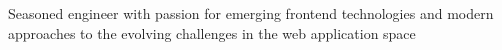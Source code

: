 


\begin{cvparagraph}
Seasoned engineer with passion for emerging frontend technologies and modern approaches to the evolving challenges in the web application space
\end{cvparagraph}

